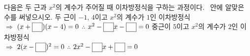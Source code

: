 다음은 두 근과 $x^2$의 계수가 주어질 때 이차방정식을 구하는 과정이다. \blank\ 안에 알맞은 수를 써넣으시오.
 두 근이 $-1$, $4$이고 $x^2$의 계수가 $1$인 이차방정식\\ $\Rightarrow$ $(x+\blank)(x-4)=0$ \quad $\therefore$ $x^2-\blank x-\blank=0$
 중근이 $5$이고 $x^2$의 계수가 $2$인 이차방정식\\ $\Rightarrow$ $2(x-\blank)^2=0$ \quad $\therefore$ $2x^2-\blank x+\blank=0$

